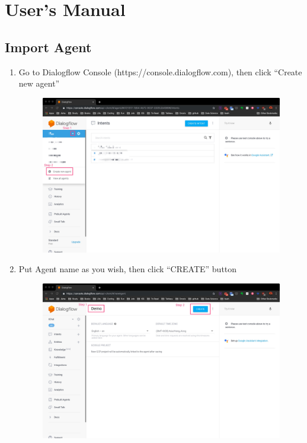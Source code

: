 
\chapter{User's Manual} %
\label{cha:user_s_manual}

\section{Import Agent} %
\label{sec:import_agent}

\begin{enumerate}

	\item Go to Dialogflow Console (https://console.dialogflow.com), then click “Create new agent”

	\begin{figure}[H]
		\centering
		\includegraphics[width=\linewidth, frame]{img/manual_1.jpg}
	\end{figure}

	\item Put Agent name as you wish, then click “CREATE” button

	\begin{figure}[H]
		\centering
		\includegraphics[width=\linewidth, frame]{img/manual_2.jpg}
	\end{figure}


\end{enumerate}

